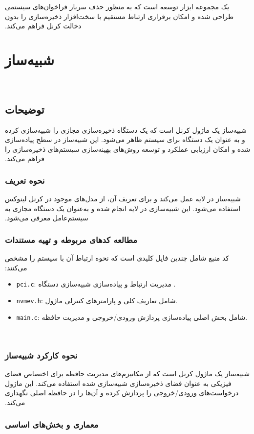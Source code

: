 ‫ یک مجموعه ابزار توسعه است که به منظور حذف سربار فراخوان‌های سیستمی طراحی شده و امکان برقراری ارتباط مستقیم با سخت‌افزار ذخیره‌سازی را بدون دخالت کرنل فراهم می‌کند.
‫
‫\section{شبیه‌ساز }
‫
‫\subsection*{توضیحات}
‫شبیه‌ساز  یک ماژول کرنل است که یک دستگاه ذخیره‌سازی مجازی را شبیه‌سازی کرده و به عنوان یک دستگاه  برای سیستم ظاهر می‌شود. این شبیه‌ساز در سطح  پیاده‌سازی شده و امکان ارزیابی عملکرد و توسعه روش‌های بهینه‌سازی سیستم‌های ذخیره‌سازی را فراهم می‌کند.
‫
‫\subsubsection*{نحوه تعریف }
‫شبیه‌ساز  در لایه  عمل می‌کند و برای تعریف آن، از مدل‌های  موجود در کرنل لینوکس استفاده می‌شود. این شبیه‌سازی در لایه  انجام شده و به‌عنوان یک دستگاه مجازی به سیستم‌عامل معرفی می‌شود.
‫
‫\subsubsection*{مطالعه کدهای مربوطه و تهیه مستندات}
‫کد منبع  شامل چندین فایل کلیدی است که نحوه ارتباط آن با سیستم را مشخص می‌کنند:
‫\begin{itemize}
‫	\item \texttt{pci.c}: مدیریت ارتباط  و پیاده‌سازی شبیه‌سازی دستگاه .
‫	\item \texttt{nvmev.h}: شامل تعاریف کلی و پارامترهای کنترلی ماژول.
‫	\item \texttt{main.c}: شامل بخش اصلی پیاده‌سازی پردازش ورودی/خروجی و مدیریت حافظه.
‫\end{itemize}
‫
‫\subsubsection*{نحوه کارکرد شبیه‌ساز}
‫شبیه‌ساز  یک ماژول کرنل است که از مکانیزم‌های مدیریت حافظه برای اختصاص فضای فیزیکی به عنوان فضای ذخیره‌سازی شبیه‌سازی شده استفاده می‌کند. این ماژول درخواست‌های ورودی/خروجی را پردازش کرده و آن‌ها را در حافظه اصلی نگهداری می‌کند.
‫
‫\subsubsection*{معماری و بخش‌های اساسی}
